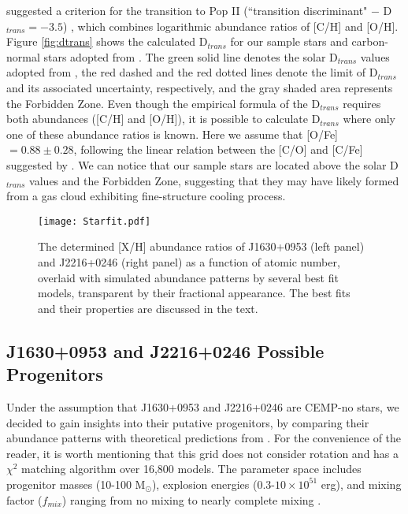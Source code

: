 \citet{2007MNRAS.380L..40F} suggested a criterion for the transition to Pop II
(``transition discriminant" $-$ D$_{trans} = -3.5$) , which combines logarithmic
abundance ratios of [C/H]  and [O/H]. Figure \ref{fig:dtrans}
shows the calculated D$_{trans}$ for our sample stars and carbon-normal stars
adopted from \citet{2013ApJ...762...26Y}. The green solid line denotes the solar
D$_{trans}$ values adopted from \citet{2009ARAA..47..481A}, the red dashed and
the red dotted lines denote the limit of D$_{trans}$ and its associated
uncertainty, respectively, and the gray shaded area represents the Forbidden
Zone. Even though the empirical formula of the D$_{trans}$ requires both
abundances ([C/H] and [O/H]), it is possible to calculate
D$_{trans}$ where only  one of these abundance ratios is known. Here we assume
that [O/Fe] $= 0.88 \pm 0.28$, following the linear relation between the
[C/O] and [C/Fe] suggested by \citet{2004A&A...416.1117C}. We can
notice that our sample stars are located above the solar D$_{trans}$ values and
the Forbidden Zone, suggesting that they may have likely formed from a gas cloud
exhibiting fine-structure cooling process.


\begin{figure}[!ht]
\centering
\texttt{[image: Starfit.pdf]} 
\caption{The determined [X/H] abundance ratios of J1630+0953 (left panel)
and J2216+0246 (right panel) as a function of atomic number, overlaid with
simulated abundance patterns by several best fit models, transparent by their
fractional appearance. The best fits and their properties are discussed in the
text.}
\label{fig:starfit}
\end{figure}

\subsection{J1630+0953 and J2216+0246 Possible Progenitors}

Under the assumption that J1630+0953 and J2216+0246 are CEMP-no stars, we
decided to gain insights into their putative progenitors, by comparing their
abundance patterns with theoretical predictions from
\citet[][]{2010ApJ...724..341H}.  For the convenience of the reader, it is worth
mentioning that this grid does not consider rotation and has a $\chi^{2}$
matching algorithm over 16,800 models.  The parameter space includes progenitor
masses (10-100 M$_{\odot}$), explosion energies ($0.3$-$10 \times 10^{51}$ erg),
and mixing factor ($f_{mix}$) ranging from no mixing to nearly complete mixing
\citep[see][for more information]{2010ApJ...724..341H}. 

